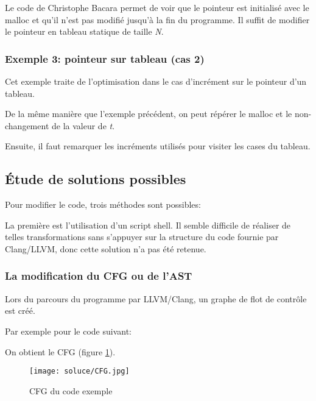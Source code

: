 \documentclass[11pt]{article}
\begin{document}
      Le code de Christophe Bacara permet de voir que le pointeur est initialisé avec le malloc et qu'il n'est pas modifié jusqu'à la fin du programme.
      Il suffit de modifier le pointeur en tableau statique de taille \textit{N}.
      
    
    \subsubsection{Exemple 3: pointeur sur tableau (cas 2)}
     Cet exemple traite de l'optimisation dans le cas d'incrément sur le pointeur d'un tableau.
    
    
    De la même manière que l'exemple précédent, on peut répérer le malloc et le non-changement de la valeur de \textit{t}.
    
    Ensuite, il faut remarquer les incréments utilisés pour visiter les cases du tableau.
    
    

    \subsection{Étude de solutions possibles}
  
    Pour modifier le code, trois méthodes sont possibles:
    
    La première est l'utilisation d'un script shell. Il semble
     difficile de réaliser de telles transformations sans s'appuyer
     sur la structure du code fournie par Clang/LLVM, donc cette
     solution n'a pas été retenue.

    
     \subsubsection{ La modification du CFG ou de l'AST}
	  Lors du parcours du programme par LLVM/Clang, un graphe de
          flot de contrôle est créé.
	  
	  Par exemple pour le code suivant: 
	  
      
      
      On obtient le CFG (figure \ref{fig:CFG}).
	  \begin{figure}[H]
	    \centering
	    \texttt{[image: soluce/CFG.jpg]} 
	    \caption{CFG du code exemple}
	    \label{fig:CFG}
	  \end{figure}
	  
\end{document}
